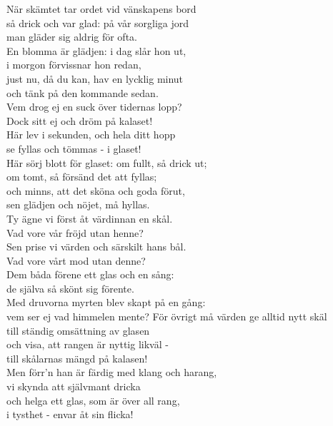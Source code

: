\documentclass[a6paper, 10pt, twoside]{article}
\begin{document}
\noindent
\begin{center}
\end{center}
\begin{lyrics}
När skämtet tar ordet vid vänskapens bord\\
så drick och var glad: på vår sorgliga jord\\
man gläder sig aldrig för ofta.\\
En blomma är glädjen: i dag slår hon ut,\\
i morgon förvissnar hon redan,\\
just nu, då du kan, hav en lycklig minut\\
och tänk på den kommande sedan.
\vspace{5pt}\\
Vem drog ej en suck över tidernas lopp?\\
Dock sitt ej och dröm på kalaset!\\
Här lev i sekunden, och hela ditt hopp\\
se fyllas och tömmas - i glaset!\\
Här sörj blott för glaset: om fullt, så drick ut;\\
om tomt, så försänd det att fyllas;\\
och minns, att det sköna och goda förut,\\
sen glädjen och nöjet, må hyllas.
\vspace{5pt}\\
Ty ägne vi först åt värdinnan en skål.\\
Vad vore vår fröjd utan henne?\\
Sen prise vi värden och särskilt hans bål.\\
Vad vore vårt mod utan denne?\\
Dem båda förene ett glas och en sång:\\
de själva så skönt sig förente.\\
Med druvorna myrten blev skapt på en gång:\\
vem ser ej vad himmelen mente?
\noindent
För övrigt må värden ge alltid nytt skäl\\
till ständig omsättning av glasen\\
och visa, att rangen är nyttig likväl -\\
till skålarnas mängd på kalasen!\\
Men förr'n han är färdig med klang och harang,\\
vi skynda att självmant dricka\\
och helga ett glas, som är över all rang,\\
i tysthet - envar åt sin flicka!\\
\end{lyrics}   
\end{document}
